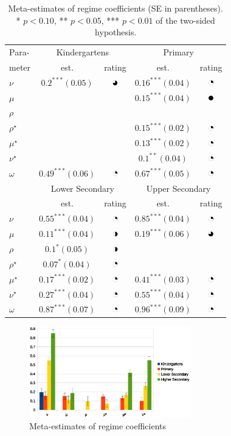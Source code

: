 \documentclass[fleqn,10pt]{wlscirep}
\def\rateiv{\includegraphics[width=0.25cm]{14.jpg}}
\def\rateiii{\includegraphics[width=0.25cm]{24.jpg}}
\def\rateii{\includegraphics[width=0.25cm]{34.jpg}}
\def\ratei{\includegraphics[width=0.25cm]{44.jpg}}
\begin{document}
\begin{table}
\begin{center}
\small
\begin{tabular}{l|cc|cc} Para- & \multicolumn{2}{c|}{Kindergartens}  & \multicolumn{2}{c}{Primary} \\ meter  & est.  & rating & est. & rating \\  \hline  
$\nu$& $0.2^{***}(0.05)$&\rateii& $0.16^{***}(0.04)$&\rateiv\\
$\mu$&&& $0.15^{***}(0.04)$&\ratei\\
$\rho$&&&&\\
$\rho^\star$&&& $0.15^{***}(0.02)$&\rateiv\\
$\mu^\star$&&& $0.13^{***}(0.02)$&\rateiv\\
$\nu^\star$&&& $0.1^{**}(0.04)$&\rateiv\\
$\omega$& $0.49^{***}(0.06)$& \rateiv& $0.67^{***}(0.05)$& \rateiv\\ \hline
& \multicolumn{2}{c|}{Lower Secondary} & \multicolumn{2}{c}{Upper Secondary} \\  & est. &  rating & est. &  rating \\ \hline
$\nu$& $0.55^{***}(0.04)$&\rateiv& $0.85^{***}(0.04)$& \rateiv\\
$\mu$& $0.11^{***}(0.04)$&\rateiii& $0.19^{***}(0.06)$& \rateii\\
$\rho$& $0.1^{*}(0.05)$&\rateiii&& \\
$\rho^\star$& $0.07^{*}(0.04)$&\rateiv&& \\
$\mu^\star$& $0.17^{***}(0.02)$&\rateiv& $0.41^{***}(0.03)$& \rateiv\\
$\nu^\star$& $0.27^{***}(0.04)$&\rateiv& $0.55^{***}(0.04)$& \rateiv\\
$\omega$& $0.87^{***}(0.07)$& \rateiv& $0.96^{***}(0.09)$& \rateiv\\
\end{tabular}




\caption{Meta-estimates of regime coefficients (SE in parentheses). * $p < 0.10$, ** $p < 0.05$, *** $p < 0.01$ of the two-sided hypothesis.}
\label{tab:metacomp}
\end{center}
\end{table}

\begin{figure}
\begin{center}
\includegraphics[width=7cm]{coefs.eps}
\caption{Meta-estimates of regime coefficients}
\label{fig:metacomp}
\end{center}
\end{figure}
\end{document}
